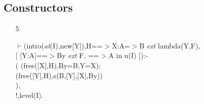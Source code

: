 \documentclass[11pt]{report}
\begin{document}
 \subsection{Constructors}
  
 \begin{enumerate}
 \item[5]
\begin{sf}\begin{tabbing}
$\vdash$(intro(\mbox{\it at}(I),new[Y]),H==$>$X:A=$>$B \mbox{\it ext} lambda(Y,F), \\[-0.15ex]
\hspace{2em}[ [Y:A]==$>$By \mbox{\it ext} F, ==$>$A in u(I) ]):-\\[-0.15ex]
\hspace{2em}( (free([X],H),By=B,Y=X);\\[-0.15ex]
\hspace{3em}(free([Y],H),s(B,[Y],[X],By))\\[-0.15ex]
\hspace{2em}),\\[-0.15ex]
\hspace{2em}!,level(I).
\end{tabbing}\end{sf}


\end{enumerate}
\end{document}
